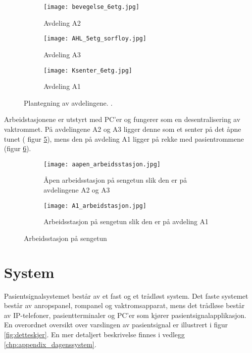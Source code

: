 \begin{figure}[H]
        \centering
        \begin{subfigure}[b]{1.0\textwidth}
        		\centering
				\texttt{[image: bevegelse\_6etg.jpg]}
				\caption{Avdeling A2}
				\label{fig:Bevegelse}
        \end{subfigure}
        
        \begin{subfigure}[b]{1.0\textwidth}
        		\centering
				\texttt{[image: AHL\_5etg\_sorfloy.jpg]}
				\caption{Avdeling A3}
				\label{fig:AHL}
        \end{subfigure}
        
        \begin{subfigure}[b]{1.0\textwidth}
        		\centering
				\texttt{[image: Ksenter\_6etg.jpg]}
				\caption{Avdeling A1}
				\label{fig:Ksenter}		
        \end{subfigure}
        \caption{Plantegning av avdelingene. \citep{sykehuskart}.}
        \label{Plantegninger}
\end{figure}

\noindent
Arbeidstasjonene er utstyrt med PC'er og fungerer som en desentralisering av vaktrommet. På avdelingene A2 og A3 ligger denne som et senter på det åpne tunet ( figur \ref{fig:aapen_arbeidsstasjon}), mens den på avdeling A1 ligger på rekke med pasientrommene (figur \ref{fig:A1_arbeidsstasjon}).

\begin{figure}[H]
\centering
	\begin{subfigure}[b]{1.0\textwidth}
		\centering
		\texttt{[image: aapen\_arbeidsstasjon.jpg]}
		\caption{Åpen arbeidsstasjon på sengetun slik den er på avdelingene A2 og A3 			\citep{sykehuskart}}
		\label{fig:aapen_arbeidsstasjon}
	\end{subfigure}
	
	\begin{subfigure}[b]{1.0\textwidth}
		\centering
		\texttt{[image: A1\_arbeidstasjon.jpg]}
		\caption{Arbeidsstasjon på sengetun slik den er på avdeling A1 							\citep{sykehuskart}}
		\label{fig:A1_arbeidsstasjon}
	\end{subfigure}
\caption{Arbeidsstasjon på sengetun}
\label{fig:arbeidsstasjon}
\end{figure}

\section{System}
Pasientsignalsystemet består av et fast og et trådløst system. Det faste systemet består av anropspanel, rompanel og vaktromsapparat, mens det trådløse består av IP-telefoner, pasientterminaler og PC'er som kjører pasientsignalapplikasjon. En overordnet oversikt over varslingen av pasientsignal er illustrert i figur \ref{fig:detteskjer}. En mer detaljert beskrivelse finnes i vedlegg \ref{chp:appendix_dagenssystem}.

